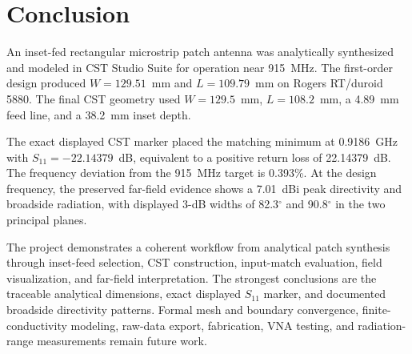 \section{Conclusion}
\label{sec:conclusion}

An inset-fed rectangular microstrip patch antenna was analytically synthesized and
modeled in CST Studio Suite for operation near 915~MHz. The first-order design produced
$W=129.51$~mm and $L=109.79$~mm on Rogers RT/duroid 5880. The final CST geometry
used $W=129.5$~mm, $L=108.2$~mm, a 4.89~mm feed line, and a 38.2~mm inset depth.

The exact displayed CST marker placed the matching minimum at 0.9186~GHz with
$S_{11}=-22.14379$~dB, equivalent to a positive return loss of 22.14379~dB. The
frequency deviation from the 915~MHz target is 0.393\%. At the design frequency, the
preserved far-field evidence shows a 7.01~dBi peak directivity and broadside radiation,
with displayed 3-dB widths of 82.3$^\circ$ and 90.8$^\circ$ in the two principal
planes.

The project demonstrates a coherent workflow from analytical patch synthesis through
inset-feed selection, CST construction, input-match evaluation, field visualization,
and far-field interpretation. The strongest conclusions are the traceable analytical
dimensions, exact displayed $S_{11}$ marker, and documented broadside directivity
patterns. Formal mesh and boundary convergence, finite-conductivity modeling, raw-data
export, fabrication, VNA testing, and radiation-range measurements remain future work.
